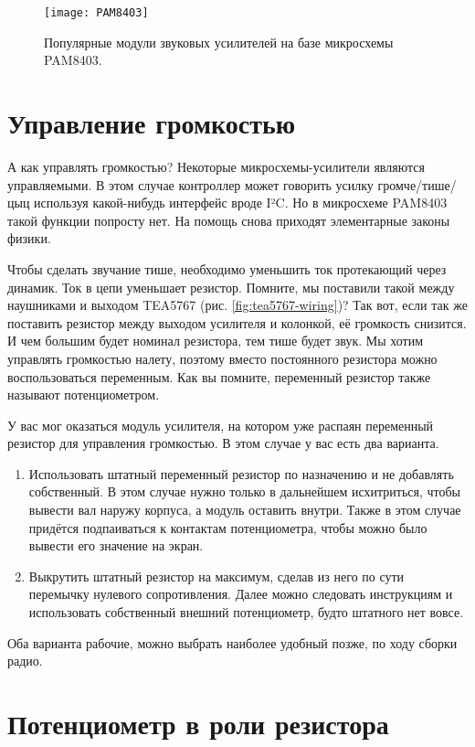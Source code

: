 \begin{figure}
  \centering
  \texttt{[image: PAM8403]}
  \caption{Популярные модули звуковых усилителей на базе микросхемы PAM8403.}
  \label{fig:pam8403-modules}
\end{figure}

\section{Управление громкостью}

А как управлять громкостью? Некоторые микросхемы-усилители являются управляемыми. В этом случае контроллер может говорить усилку громче/тише/цыц используя какой-нибудь интерфейс вроде I²C. Но в микросхеме PAM8403 такой функции попросту нет. На помощь снова приходят элементарные законы физики.

Чтобы сделать звучание тише, необходимо уменьшить ток протекающий через динамик. Ток в цепи уменьшает резистор. Помните, мы поставили такой между наушниками и выходом TEA5767 (рис. \ref{fig:tea5767-wiring})? Так вот, если так же поставить резистор между выходом усилителя и колонкой, её громкость снизится. И чем большим будет номинал резистора, тем тише будет звук. Мы хотим управлять громкостью налету, поэтому вместо постоянного резистора можно воспользоваться переменным. Как вы помните, переменный резистор также называют потенциометром.

У вас мог оказаться модуль усилителя, на котором уже распаян переменный резистор для управления громкостью. В этом случае у вас есть два варианта.

\begin{enumerate}
  \item Использовать штатный переменный резистор по назначению и не добавлять собственный. В этом случае нужно только в дальнейшем исхитриться, чтобы вывести вал наружу корпуса, а модуль оставить внутри. Также в этом случае придётся подпаиваться к контактам потенциометра, чтобы можно было вывести его значение на экран.
  \item Выкрутить штатный резистор на максимум, сделав из него по сути перемычку нулевого сопротивления. Далее можно следовать инструкциям и использовать собственный внешний потенциометр, будто штатного нет вовсе.
\end{enumerate}

Оба варианта рабочие, можно выбрать наиболее удобный позже, по ходу сборки радио.

\section{Потенциометр в роли резистора}

